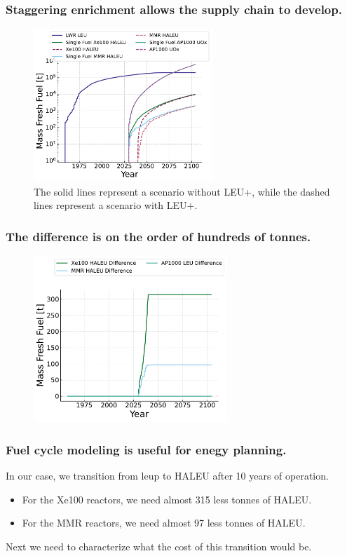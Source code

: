 \documentclass[9pt]{beamer}
\begin{document}
  \begin{frame}
    \frametitle{Staggering enrichment allows the supply chain to develop.}

    \begin{figure}
        \centering
        \includegraphics[width=0.6\textwidth]{images/fresh_fuel.pdf}
        \caption{The solid lines represent a scenario without LEU+, while the dashed lines represent a scenario with LEU+.}
    \end{figure}
  \end{frame}

  \begin{frame}
    \frametitle{The difference is on the order of hundreds of tonnes.}
    \begin{figure}
        \centering
        \includegraphics[width=0.65\textwidth]{images/fresh_fuel_difference.pdf}
    \end{figure}
  \end{frame}

  \begin{frame}
      \frametitle{Fuel cycle modeling is useful for enegy planning.}
      In our case, we transition from \gls{leup} to HALEU after 10 years of operation.
      \begin{itemize}
          \item For the Xe100 reactors, we need almost 315 less tonnes of HALEU.
          \item For the MMR reactors, we need almost 97 less tonnes of HALEU.
      \end{itemize}
      Next we need to characterize what the cost of this transition would be.
  \end{frame}
\end{document}
